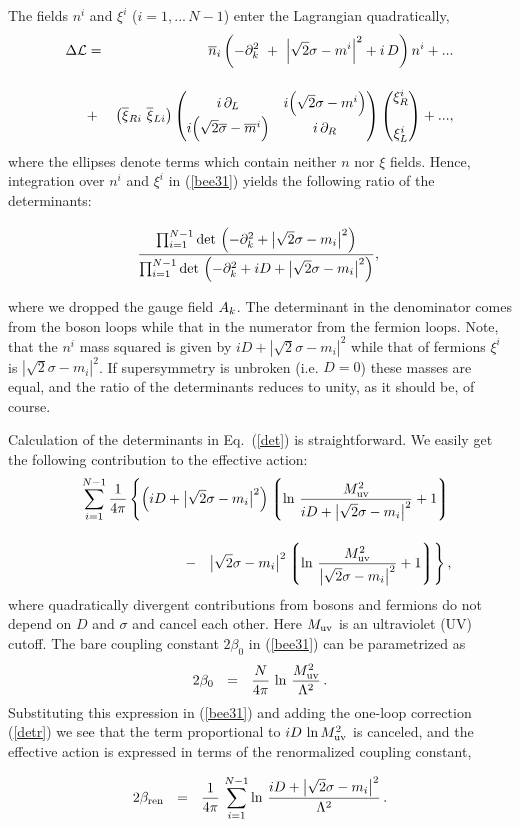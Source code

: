 \documentclass[epsfig,12pt]{article}
\def\beq{\begin{equation}}
\def\eeq{\end{equation}}
\def\beqn{\begin{eqnarray}}
\def\eeqn{\end{eqnarray}}
\newcommand{\cell}{{\mathcal L}}
\newcommand{\pt}{\partial}
\def\beqn{\begin{eqnarray}}
\def\eeqn{\end{eqnarray}}
\def\beq{\begin{equation}}
\def\eeq{\end{equation}}
\newcommand{\p}{\partial}
\newcommand{\ov}{\overline}
\newcommand{\lgr}{\left\lgroup}
\newcommand{\rgr}{\right\rgroup}
\newcommand{\nbar}{\ov{n}}
\newcommand{\bxi}{\ov{\xi}{}}
\begin{document}
The fields $ n^i $ and $ \xi^i $  ($ i = 1,...\, N-1 $) enter the Lagrangian quadratically,
\beqn
\Delta\cell &=&
 \nbar{}_i 
		   \left( - \p_k^2 ~+~ \Bigl| \sqrt{2}\sigma - m^i \Bigr|^2 +  i\, D \right) n^i
		   + ...
\nonumber\\[4mm]
&+&
\left( \bxi_{Ri}\,\,  \bxi_{Li} \right)
		\left( \begin{matrix}
			i\,\pt_L  &  
			i \Bigl(\sqrt{2}\sigma -  m^i\Bigr) \\
			i \Bigl(\sqrt{2}\ov{\sigma} - \ov{m}{}^i \Bigr) &  
			i\,\p_R 
		     \end{matrix} \right)
		\left( \begin{matrix}
			\xi_R^i \\[5mm] \xi_L^i
		     \end{matrix} \right)+ ... ,
\eeqn
where the ellipses denote terms which contain neither $n$ nor $\xi$ fields.
Hence, integration over $n^{i}$ and $\xi^i$ in (\ref{bee31})
yields the following ratio of the determinants:
\beq
 \frac{
\prod_{i=1}^{N-1} {\rm det}\, \left(-\pt_{k}^2 
   + \bigl| \sqrt{2}\sigma - m_i \bigr|^2\right)}{
\prod_{i=1}^{N-1}{\rm det}\, \left(-\pt_{k}^2 +iD
   + \bigl| \sqrt{2}\sigma - m_i \bigr|^2\right)},
\rule{0mm}{10mm}
\label{det}
\eeq
where we dropped the gauge field $A_k\rule{0mm}{5mm}$. The  determinant in the denominator
comes from the
boson loops while that in the numerator from the fermion loops. Note, that the $n^{i}$ mass 
squared
 is given by $iD+|\sqrt{2}\sigma-m_i|^2$ while that of fermions $\xi^i$
is $|\sqrt{2}\sigma-m_i|^2$. If supersymmetry is unbroken (i.e.  $D=0$) these masses are equal,
and the ratio of the determinants reduces to unity, as
it should be, of course.

Calculation of the determinants in Eq.~(\ref{det}) 
is straightforward. 
We easily get the following contribution to the
effective action:
\beqn
&&\sum_{i=1}^{N-1}\frac{1}{4\pi}\left\{\left(iD+\bigl|\sqrt{2}\sigma-m_i\bigr|^2\right)
\lgr \ln\, {\frac{M_{\rm uv}^2}{iD + \bigl|\sqrt{2}\sigma-m_i\bigr|^2}} + 1 \rgr
\right.
\nonumber\\[4mm]
&&\qquad-~~
\left. 
\bigl|\sqrt{2}\sigma-m_i\bigr|^2
\lgr \ln\, {\frac{M_{\rm uv}^2}{\bigl|\sqrt{2}\sigma-m_i\bigr|^2}} + 1\rgr
\right\},
\label{detr}
\eeqn
where quadratically divergent contributions from bosons and fermions do
not depend on
$D$ and $\sigma$ and cancel each other. Here $M_{\rm uv}$ is an ultraviolet (UV) cutoff.
 The bare coupling constant
 $2\beta_0$ in (\ref{bee31}) can be parametrized as
\beq
2\beta_0~~=~~\frac{N}{4\pi}\, \ln\, {\frac{M_{\rm uv}^2}{\Lambda^2}}\,.
\eeq
Substituting this expression in (\ref{bee31}) and adding 
the one-loop correction
(\ref{detr})
we see that the term proportional to 
$iD \,\ln {M_{\rm uv}^2}$ is canceled, and the effective action is
expressed in terms of the renormalized coupling constant,
\beq
\rule{0mm}{8mm}
	2\beta_{\rm ren}~~=~~\frac{1}{4\pi}\, 
	\sum_{i=1}^{N-1}\ln\, {\frac{iD +\bigl|\sqrt{2}\sigma-m_i\bigr|^2}{\Lambda^2}}\, .
\label{coupling}
\eeq
\end{document}
